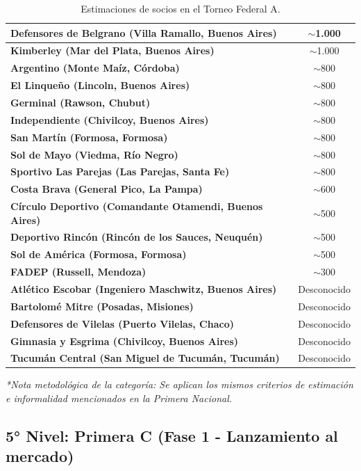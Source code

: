 \begin{table}[h!]
\begin{tabularx}{\textwidth}{|X|c|}
\textbf{Defensores de Belgrano (Villa Ramallo, Buenos Aires)} & $\sim$1.000 \\ \hline
\textbf{Kimberley (Mar del Plata, Buenos Aires)} & $\sim$1.000 \\ \hline
\textbf{Argentino (Monte Maíz, Córdoba)} & $\sim$800 \\ \hline
\textbf{El Linqueño (Lincoln, Buenos Aires)} & $\sim$800 \\ \hline
\textbf{Germinal (Rawson, Chubut)} & $\sim$800 \\ \hline
\textbf{Independiente (Chivilcoy, Buenos Aires)} & $\sim$800 \\ \hline
\textbf{San Martín (Formosa, Formosa)} & $\sim$800 \\ \hline
\textbf{Sol de Mayo (Viedma, Río Negro)} & $\sim$800 \\ \hline
\textbf{Sportivo Las Parejas (Las Parejas, Santa Fe)} & $\sim$800 \\ \hline
\textbf{Costa Brava (General Pico, La Pampa)} & $\sim$600 \\ \hline
\textbf{Círculo Deportivo (Comandante Otamendi, Buenos Aires)} & $\sim$500 \\ \hline
\textbf{Deportivo Rincón (Rincón de los Sauces, Neuquén)} & $\sim$500 \\ \hline
\textbf{Sol de América (Formosa, Formosa)} & $\sim$500 \\ \hline
\textbf{FADEP (Russell, Mendoza)} & $\sim$300 \\ \hline
\textbf{Atlético Escobar (Ingeniero Maschwitz, Buenos Aires)} & Desconocido \\ \hline
\textbf{Bartolomé Mitre (Posadas, Misiones)} & Desconocido \\ \hline
\textbf{Defensores de Vilelas (Puerto Vilelas, Chaco)} & Desconocido \\ \hline
\textbf{Gimnasia y Esgrima (Chivilcoy, Buenos Aires)} & Desconocido \\ \hline
\textbf{Tucumán Central (San Miguel de Tucumán, Tucumán)} & Desconocido \\ \hline
\end{tabularx}
\caption{Estimaciones de socios en el Torneo Federal A.}
\label{tab:anexo_federal_a}
\end{table}

\textit{*Nota metodológica de la categoría: Se aplican los mismos criterios de estimación e informalidad mencionados en la Primera Nacional.}

\newpage

\subsection{5° Nivel: Primera C (Fase 1 - Lanzamiento al mercado)}

